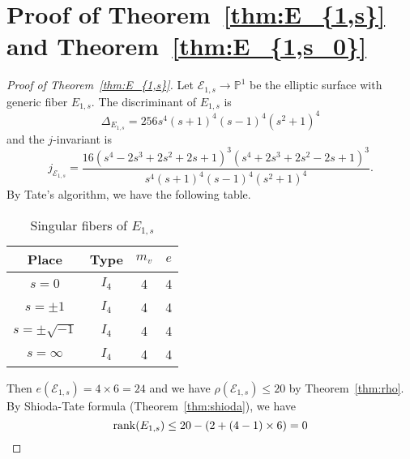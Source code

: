 \documentclass[main]{subfiles}
\begin{document}
\section{Proof of Theorem~\ref{thm:E_{1,s}} and Theorem~\ref{thm:E_{1,s_0}}}

\begin{proof}[Proof of Theorem~\ref{thm:E_{1,s}}]

    Let $\mathcal{E}_{1,s} \to \mathbb{P}^{1}$ be the elliptic surface with generic fiber $E_{1,s}$.
    The discriminant of $E_{1,s}$ is
    \begin{equation}
        \label{eq:discriminant1s}
        \Delta_{E_{1,s}} = 256s^{4} (s + 1)^{4} (s - 1)^{4} (s^{2} + 1)^{4}
    \end{equation}
    and the $j$-invariant is
    \begin{equation*}
        j_{\mathcal{E}_{1,s}} = \frac{16 (s^{4} - 2 s^{3} + 2 s^{2} + 2 s + 1)^{3} (s^{4} + 2 s^{3} + 2 s^{2} - 2 s + 1)^{3}}{s ^{4} (s + 1)^{4} (s - 1)^{4}(s^{2} + 1)^{4}}.
    \end{equation*}
    By Tate's algorithm, we have the following table.
    \begin{table}[H]
        \centering
        \caption{Singular fibers of $E_{1,s}$}
        \begin{tabular}{|c|c|c|c|}
            \hline
            Place             & Type  & $m_v$ & $e$ \\
            \hline
            $s=0$             & $I_4$ & 4     & 4   \\
            $s=\pm 1$         & $I_4$ & 4     & 4   \\
            $s=\pm \sqrt{-1}$ & $I_4$ & 4     & 4   \\
            $s=\infty$        & $I_4$ & 4     & 4   \\
            \hline
        \end{tabular}
    \end{table}

    Then $e(\mathcal{E}_{1,s}) = 4 \times 6 = 24$ and we have $\rho(\mathcal{E}_{1,s}) \leq 20$ by Theorem~\ref{thm:rho}.
    By Shioda-Tate formula (Theorem~\ref{thm:shioda}), we have
    \begin{equation*}
        \operatorname{rank}(E_{1,s}) \leq 20 - (2 + (4 - 1) \times 6) = 0
    \end{equation*}


\end{proof}
\end{document}
